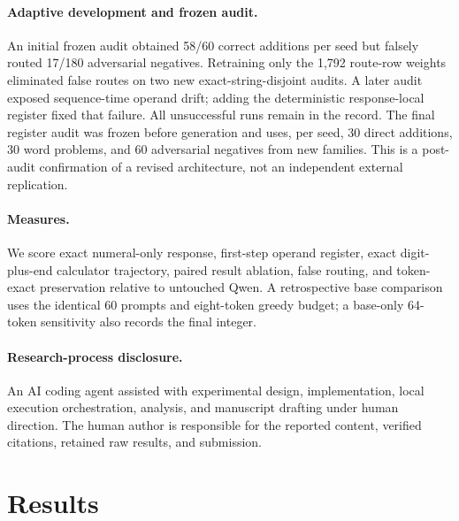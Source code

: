 \documentclass{article}
\begin{document}
\paragraph{Adaptive development and frozen audit.}
An initial frozen audit obtained 58/60 correct additions per seed but falsely
routed 17/180 adversarial negatives. Retraining only the 1,792 route-row
weights eliminated false routes on two new exact-string-disjoint audits. A
later audit exposed sequence-time operand drift; adding the deterministic
response-local register fixed that failure. All unsuccessful runs remain in
the record. The final register audit was frozen before generation and uses, per
seed, 30 direct additions, 30 word problems, and 60 adversarial negatives from
new families. This is a post-audit confirmation of a revised architecture,
not an independent external replication.

\paragraph{Measures.}
We score exact numeral-only response, first-step operand register, exact
digit-plus-end calculator trajectory, paired result ablation, false routing,
and token-exact preservation relative to untouched Qwen. A retrospective base
comparison uses the identical 60 prompts and eight-token greedy budget; a
base-only 64-token sensitivity also records the final integer.

\paragraph{Research-process disclosure.}
An AI coding agent assisted with experimental design, implementation, local
execution orchestration, analysis, and manuscript drafting under human
direction. The human author is responsible for the reported content, verified
citations, retained raw results, and submission.

\section{Results}
\end{document}
